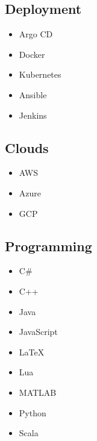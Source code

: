 \documentclass[letterpaper]{resume}
\begin{document}
\begin{minipage}[t]{0.27\textwidth}

\subsection{Deployment}
\begin{itemize}
\item Argo CD
\item Docker
\item Kubernetes
\end{itemize}

\begin{itemize}
\item Ansible
\item Jenkins
\end{itemize}

\sectionspace %


\subsection{Clouds}
\begin{itemize}
\item AWS
\item Azure
\item GCP
\end{itemize}

\sectionspace %


\subsection{Programming}
\begin{itemize}
\item C\#
\item C++
\item Java
\item JavaScript
\item \LaTeX
\item Lua
\item MATLAB
\item Python
\item Scala
\end{itemize}

\sectionspace %


\end{minipage} %
\end{document}
